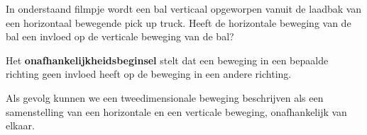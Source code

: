 \documentclass{ximera}
\begin{document}
	\author{Bart Lambregs}
    \xmsource\xmuitleg

\begin{denkvraag*}{}
In onderstaand filmpje wordt een bal verticaal opgeworpen vanuit de laadbak van een horizontaal bewegende pick up truck. 
Heeft de horizontale beweging van de bal een invloed op de verticale beweging van de bal?

	\begin{center}
	\end{center}
\end{denkvraag*}

\begin{definition}{}
	Het \textbf{onafhankelijkheidsbeginsel} stelt dat een beweging in een bepaalde richting geen invloed heeft op de beweging in een andere richting. 
\end{definition}

Als gevolg kunnen we een tweedimensionale beweging beschrijven als een samenstelling van een horizontale en een verticale beweging, onafhankelijk van elkaar.
\end{document}
